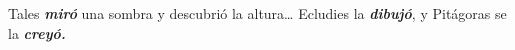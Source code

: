 \begin{capitulobox}
Tales \textbf{\textit{miró}} una sombra y descubrió la altura… Ecludies la \textbf{\textit{dibujó}}, 
y Pitágoras se la \textbf{\textit{creyó.}}
\end{capitulobox}

